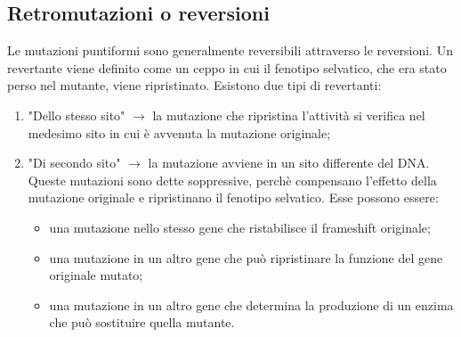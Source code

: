 \subsection{Retromutazioni o reversioni}
Le mutazioni puntiformi sono generalmente reversibili attraverso le reversioni. Un revertante viene definito come un ceppo in cui il fenotipo selvatico, che era stato perso nel mutante, viene ripristinato. Esistono due tipi di revertanti:
\begin{enumerate}
    \item "Dello stesso sito" $\xrightarrow{}$ la mutazione che ripristina l'attività si verifica nel medesimo sito in cui è avvenuta la mutazione originale; 
    \item "Di secondo sito" $\xrightarrow{}$ la mutazione avviene in un sito differente del DNA. Queste mutazioni sono dette soppressive, perchè compensano l'effetto della mutazione originale e ripristinano il fenotipo selvatico. Esse possono essere: 
    \begin{itemize}
        \item una mutazione nello stesso gene che ristabilisce il frameshift originale;
        \item una mutazione in un altro gene che può ripristinare la funzione del gene originale mutato; 
        \item una mutazione in un altro gene che determina la produzione di un enzima che può sostituire quella mutante. 
    \end{itemize}
\end{enumerate}
